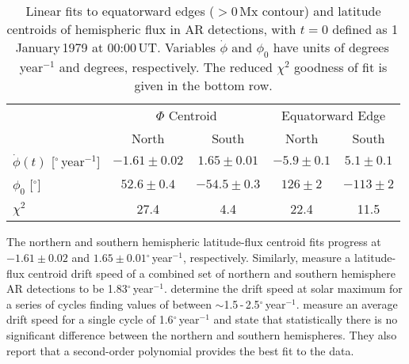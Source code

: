 \documentclass[namedreferences]{solarphysics}
\newcommand{\degr}{\ensuremath{^\circ}}
\begin{document}
\begin{article}
\begin{table}[!t]
\caption[Linear fits to AR emergence space-time extent.]{Linear fits to equatorward edges ($>$0\,Mx contour) and latitude centroids of hemispheric flux in AR detections, with $t=0$ defined as 1\,January\,1979 at 00:00\,UT. Variables $\dot{\phi}$ and $\phi_{0}$ have units of degrees\,year$^{-1}$ and degrees, respectively. The reduced $\chi^2$ goodness of fit is given in the bottom row.}
\label{table_1_line_fits}
\begin{tabular}{lcccc}
\hline
& \multicolumn{2}{c}{$\Phi$ Centroid} & \multicolumn{2}{c}{Equatorward Edge} \\
& North & South & North & South \\
\hline
$\dot{\phi}(t)$ [\degr\,year$^{-1}$] & $ -1.61 \pm 0.02 $ & $ 1.65 \pm 0.01 $ & $ -5.9 \pm 0.1 $ & $ 5.1 \pm 0.1 $ \\
$\phi_{0}$ [\degr] & $ 52.6 \pm 0.4 $ & $ -54.5 \pm 0.3 $ & $ 126 \pm 2 $ & $ -113 \pm 2 $ \\
$\chi^2$ & 27.4 & 4.4 & 22.4 & 11.5 \\
\hline
\end{tabular}
\end{table}

The northern and southern hemispheric latitude-flux centroid fits progress at $-1.61\pm0.02$ and $1.65\pm 0.01$\degr\,year$^{-1}$, respectively.
Similarly, \citet{zhang:2010} measure a latitude-flux centroid drift speed of a combined set of northern and southern hemisphere AR detections to be 1.83\degr\,year$^{-1}$. \citet{Hathaway:2003} determine the drift speed at solar maximum for a series of cycles finding values of between $\sim$1.5\,-\,2.5\degr\,year$^{-1}$. \citet{Li:2001b} measure an average drift speed for a single cycle of 1.6\degr\,year$^{-1}$ and state that statistically there is no significant difference between the northern and southern hemispheres. They also report that a second-order polynomial provides the best fit to the data.


\end{article}
\end{document}
